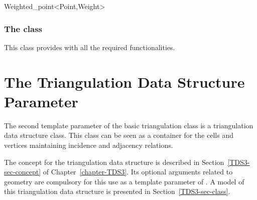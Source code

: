 \ccCreation
{}


\ccAccessFunctions
{}

		\begin{ccClassTemplate}{Weighted_point<Point,Weight>}
		\subsubsection{The class \protect{}}

This class provides 
with all the required functionalities.



		\end{ccClassTemplate}

\section{The Triangulation Data Structure Parameter}
\label{Triangulation3-sec-tds}

The second template parameter of the basic triangulation class
 is a triangulation data structure
class.  This class can be seen as a container for the cells and
vertices maintaining incidence and adjacency relations. 

The concept for the triangulation data structure is described in
Section~\ref{TDS3-sec-concept} of Chapter~\ref{chapter-TDS3}. Its optional 
arguments related to geometry are compulsory for this use as a
template parameter of .
A model of this triangulation data structure is
 presented in
Section~\ref{TDS3-sec-class}. 
